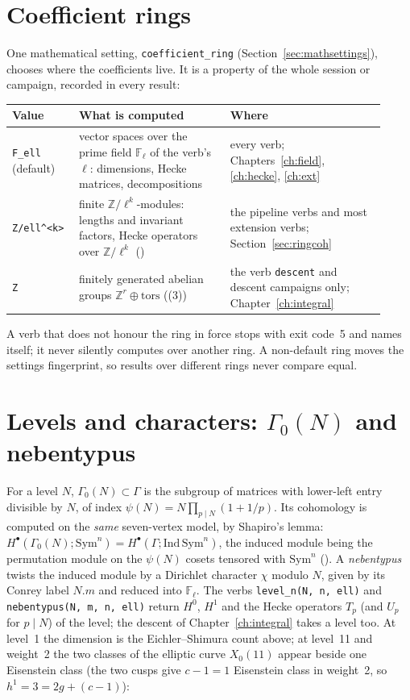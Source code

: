 \documentclass[11pt,openany]{report}
\newcommand{\Z}{\mathbb{Z}}
\newcommand{\Fl}{\mathbb{F}_{\ell}}
\newcommand{\Sym}{\mathrm{Sym}}
\newcommand{\tors}{\mathrm{tors}}
\newcommand{\Ecite}[1]{{\ttfamily[E,~#1]}}
\newcommand{\vb}[1]{\texttt{#1}}
\begin{document}
\section{Coefficient rings}\label{sec:rings}

One mathematical setting, \vb{coefficient\_ring} (Section~\ref{sec:mathsettings}), chooses where the coefficients live.
It is a property of the whole session or campaign, recorded in every result:
\begin{center}\small
\begin{tabular}{@{}>{\raggedright\arraybackslash}p{0.15\linewidth}>{\raggedright\arraybackslash}p{0.38\linewidth}>{\raggedright\arraybackslash}p{0.39\linewidth}@{}}
\toprule
\textbf{Value} & \textbf{What is computed} & \textbf{Where}\\\midrule
\vb{F\_ell} (default) & vector spaces over the prime field $\Fl$ of the verb's $\ell$: dimensions, Hecke matrices, decompositions & every verb; Chapters~\ref{ch:field}, \ref{ch:hecke}, \ref{ch:ext}\\
\vb{Z/ell\^{}<k>} & finite $\Z/\ell^k$-modules: lengths and invariant factors, Hecke operators over $\Z/\ell^k$ (\Ecite{sec:ring}) & the pipeline verbs and most extension verbs; Section~\ref{sec:ringcoh}\\
\vb{Z} & finitely generated abelian groups $\Z^r\oplus\tors$ ({}(3)) & the verb \vb{descent} and descent campaigns only; Chapter~\ref{ch:integral}\\
\bottomrule
\end{tabular}
\end{center}
A verb that does not honour the ring in force stops with exit code~5 and names itself; it never silently computes over
another ring. A non-default ring moves the settings fingerprint, so results over different rings never compare equal.

\section{Levels and characters: \texorpdfstring{$\Gamma_0(N)$}{Gamma0(N)} and nebentypus}\label{sec:levels}

For a level $N$, $\Gamma_0(N)\subset\Gamma$ is the subgroup of matrices with lower-left entry divisible by $N$, of index
$\psi(N)=N\prod_{p\mid N}(1+1/p)$. Its cohomology is computed on the \emph{same} seven-vertex model, by Shapiro's lemma:
$H^\bullet(\Gamma_0(N);\Sym^n)=H^\bullet(\Gamma;\mathrm{Ind}\,\Sym^n)$, the induced module being the permutation module on
the $\psi(N)$ cosets tensored with $\Sym^n$ ({}). A \emph{nebentypus} twists the induced module by a
Dirichlet character $\chi$ modulo $N$, given by its Conrey label $N.m$ and reduced into $\Fl$. The verbs \vb{level\_n(N, n,
ell)} and \vb{nebentypus(N, m, n, ell)} return $H^0$, $H^1$ and the Hecke operators $T_p$ (and $U_p$ for $p\mid N$) of the
level; the descent of Chapter~\ref{ch:integral} takes a level too. At level~1 the dimension is the Eichler--Shimura count
above; at level~11 and weight~2 the two classes of the elliptic curve $X_0(11)$ appear beside one Eisenstein class (the
two cusps give $c-1=1$ Eisenstein class in weight~2, so $h^1=3=2g+(c-1)$):
\end{document}
